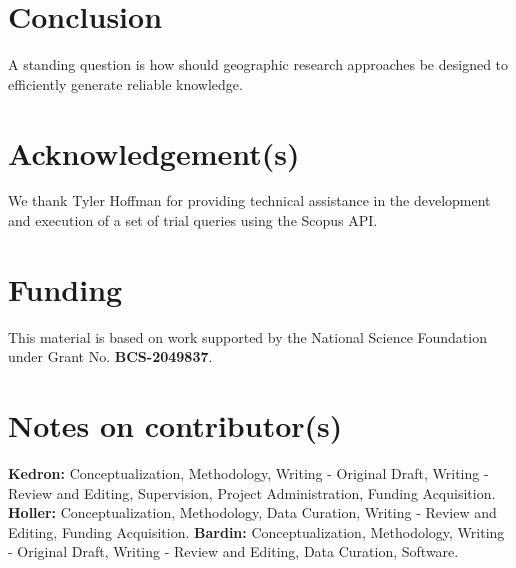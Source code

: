 \documentclass[]{interact}
\theoremstyle{plain}%
\theoremstyle{definition}
\theoremstyle{remark}
\begin{document}
\section*{Conclusion}
A standing question is how should geographic research approaches be designed to efficiently generate reliable knowledge.

\theendnotes


\section*{Acknowledgement(s)}
We thank Tyler Hoffman for providing technical assistance in the development and execution of a set of trial queries using the Scopus API.

\section*{Funding}
This material is based on work supported by the National Science Foundation under Grant No. \textbf{BCS-2049837}.

\section*{Notes on contributor(s)}
\textbf{Kedron:} Conceptualization, Methodology, Writing - Original Draft, Writing - Review and Editing, Supervision, Project Administration, Funding Acquisition. \textbf{Holler:} Conceptualization, Methodology, Data Curation, Writing - Review and Editing, Funding Acquisition. \textbf{Bardin:} Conceptualization, Methodology, Writing - Original Draft, Writing - Review and Editing, Data Curation, Software.


\newpage

\end{document}
